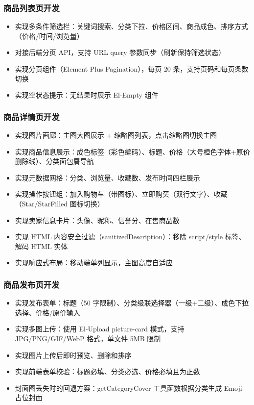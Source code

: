 \documentclass[12pt,a4paper]{ctexart}
\begin{document}
\subsubsection*{商品列表页开发}
\begin{itemize}
    \item 实现多条件筛选栏：关键词搜索、分类下拉、价格区间、商品成色、排序方式（价格/时间/浏览量）
    \item 对接后端分页 API，支持 URL query 参数同步（刷新保持筛选状态）
    \item 实现分页组件（Element Plus Pagination），每页 20 条，支持页码和每页条数切换
    \item 实现空状态提示：无结果时展示 El-Empty 组件
\end{itemize}

\subsubsection*{商品详情页开发}
\begin{itemize}
    \item 实现图片画廊：主图大图展示 + 缩略图列表，点击缩略图切换主图
    \item 实现商品信息展示：成色标签（彩色编码）、标题、价格（大号橙色字体+原价删除线）、分类面包屑导航
    \item 实现元数据网格：分类、浏览量、收藏数、发布时间四栏展示
    \item 实现操作按钮组：加入购物车（带图标）、立即购买（双行文字）、收藏（Star/StarFilled 图标切换）
    \item 实现卖家信息卡片：头像、昵称、信誉分、在售商品数
    \item 实现 HTML 内容安全过滤（sanitizedDescription）：移除 script/style 标签、解码 HTML 实体
    \item 实现响应式布局：移动端单列显示，主图高度自适应
\end{itemize}

\subsubsection*{商品发布页开发}
\begin{itemize}
    \item 实现发布表单：标题（50 字限制）、分类级联选择器（一级+二级）、成色下拉选择、价格/原价输入
    \item 实现多图上传：使用 El-Upload picture-card 模式，支持 JPG/PNG/GIF/WebP 格式，单文件 5MB 限制
    \item 实现图片上传后即时预览、删除和排序
    \item 实现前端表单校验：标题必填、分类必选、价格必填且为正数
    \item 封面图丢失时的回退方案：getCategoryCover 工具函数根据分类生成 Emoji 占位封面
\end{itemize}
\end{document}
